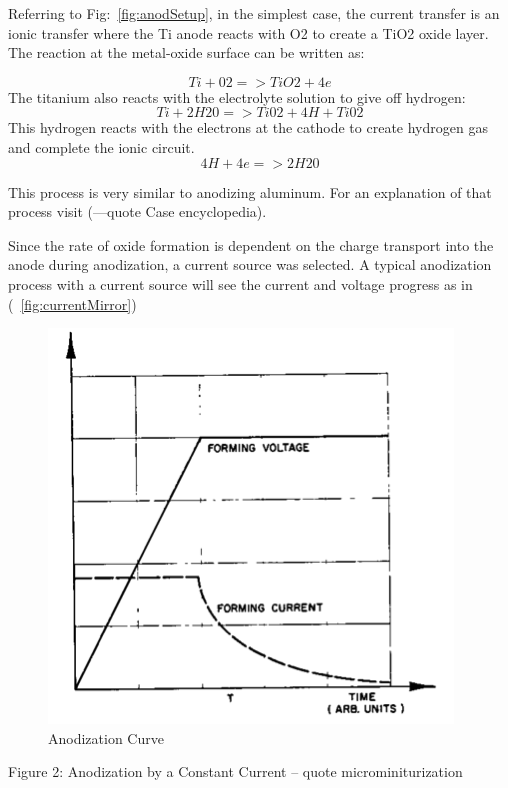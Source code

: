 \documentclass[journal]{IEEEtran}
\begin{document}
Referring to Fig:~\ref{fig:anodSetup}, in the simplest case, the current transfer is an ionic transfer where the Ti anode reacts with O2 to create a TiO2 oxide layer. The reaction at the metal-oxide surface can be written as:

\begin{equation}
Ti + 02 => TiO2 + 4e
\end{equation}
The titanium also reacts with the electrolyte solution to give off hydrogen:
\begin{equation}
Ti + 2H20 => Ti02 + 4H+Ti02
\end{equation}
This hydrogen reacts with the electrons at the cathode to create hydrogen gas and complete the ionic circuit.
\begin{equation}
4H + 4e => 2H20
\end{equation}

This process is very similar to anodizing aluminum. For an explanation of that process visit (---quote Case encyclopedia). 

Since the rate of oxide formation is dependent on the charge transport into the anode during anodization, a current source was selected. A typical anodization process with a current source will see the current and voltage progress as in (~\ref{fig:currentMirror})
 

\begin{figure}[here]
\centering
\includegraphics{anodCurve}
\caption{Anodization Curve}
\label{fig:anodCurve}
\end{figure}
Figure 2: Anodization by a Constant Current – quote microminiturization
\end{document}
